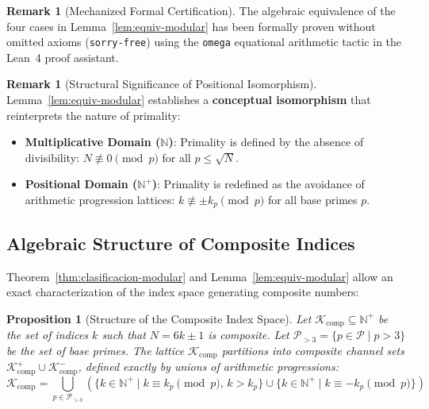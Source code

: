 \documentclass{article}
\numberwithin{equation}{section}
\theoremstyle{plain}
\newtheorem{proposition}[theorem]{Proposition}
\theoremstyle{definition}
\newtheorem{remark}[theorem]{Remark}
\begin{document}
\begin{remark}[Mechanized Formal Certification]
\label{rem:certificacion-lema-31}
The algebraic equivalence of the four cases in Lemma~\ref{lem:equiv-modular} has been formally proven without omitted axioms (\texttt{sorry-free}) using the \texttt{omega} equational arithmetic tactic in the Lean~4 proof assistant.
\end{remark}

\begin{remark}[Structural Significance of Positional Isomorphism]
\label{rem:significado-estructural}
Lemma~\ref{lem:equiv-modular} establishes a \textbf{conceptual isomorphism} that reinterprets the nature of primality:
\begin{itemize}
    \item \textbf{Multiplicative Domain ($\mathbb{N}$)}: Primality is defined by the absence of divisibility: $N \not\equiv 0 \pmod p$ for all $p \le \sqrt{N}$.
    \item \textbf{Positional Domain ($\mathbb{N}^+$)}: Primality is redefined as the avoidance of arithmetic progression lattices: $k \not\equiv \pm k_p \pmod p$ for all base primes $p$.
\end{itemize}
\end{remark}

\subsection{Algebraic Structure of Composite Indices}

Theorem~\ref{thm:clasificacion-modular} and Lemma~\ref{lem:equiv-modular} allow an exact characterization of the index space generating composite numbers:

\begin{proposition}[Structure of the Composite Index Space]
\label{prop:estructura-compuesta}
Let $\mathcal{K}_{\text{comp}} \subseteq \mathbb{N}^+$ be the set of indices $k$ such that $N = 6k \pm 1$ is composite. Let $\mathcal{P}_{>3} = \{p \in \mathcal{P} \mid p > 3\}$ be the set of base primes. The lattice $\mathcal{K}_{\text{comp}}$ partitions into composite channel sets $\mathcal{K}_{\text{comp}}^+ \cup \mathcal{K}_{\text{comp}}^-$, defined exactly by unions of arithmetic progressions:
\begin{equation}
\mathcal{K}_{\text{comp}} = \bigcup_{p \in \mathcal{P}_{>3}} \left( \{k \in \mathbb{N}^+ \mid k \equiv k_p \pmod p,\, k > k_p \} \cup \{k \in \mathbb{N}^+ \mid k \equiv -k_p \pmod p \} \right)
\end{equation}
\end{proposition}
\end{document}
